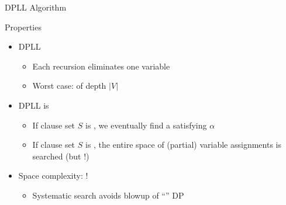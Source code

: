 \documentclass[t]{sdqbeamer}
\begin{document}
\begin{frame}{DPLL Algorithm}
	\begin{block}{Properties}
		\begin{itemize}\setlength{\itemsep}{1em}
			\item DPLL 
			\pause
			\begin{itemize}\setlength{\itemsep}{1ex}
				\item Each recursion eliminates one variable
				\item Worst case:  of depth $|V|$
			\end{itemize}
			\item DPLL is 
			\begin{itemize}\setlength{\itemsep}{1ex}
				\item If clause set $S$ is , \pause we eventually find a satisfying $\alpha$
				\item If clause set $S$ is , \pause the entire space of (partial) variable assignments is searched (but !)
			\end{itemize}
			\item Space complexity: \pause {}!
			\begin{itemize}\setlength{\itemsep}{1ex}
				\item Systematic search avoids blowup of ``'' DP
			\end{itemize}
		\end{itemize}
	\end{block}
\end{frame}
\end{document}
